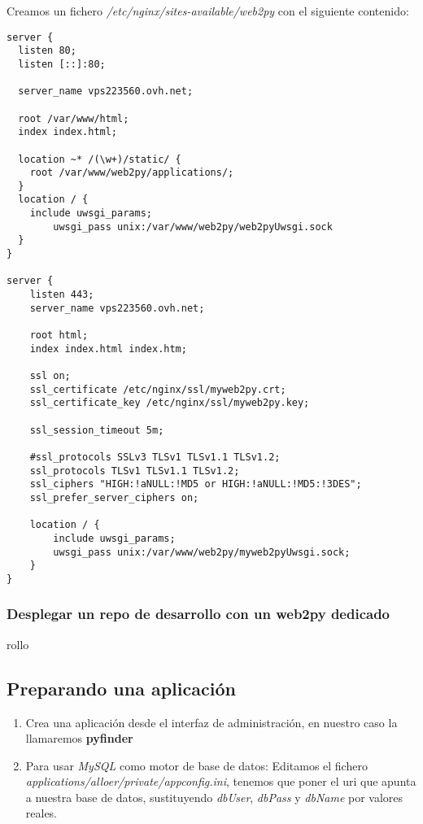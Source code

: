 \documentclass[12pt,spanish,]{article}
\begin{document}
Creamos un fichero \emph{/etc/nginx/sites-available/web2py} con el
siguiente contenido:

\begin{verbatim}
server {
  listen 80;
  listen [::]:80;

  server_name vps223560.ovh.net;

  root /var/www/html;
  index index.html;

  location ~* /(\w+)/static/ {
    root /var/www/web2py/applications/;
  }
  location / {
    include uwsgi_params;
        uwsgi_pass unix:/var/www/web2py/web2pyUwsgi.sock
  }
}

server {
    listen 443;
    server_name vps223560.ovh.net;

    root html;
    index index.html index.htm;

    ssl on;
    ssl_certificate /etc/nginx/ssl/myweb2py.crt;
    ssl_certificate_key /etc/nginx/ssl/myweb2py.key;

    ssl_session_timeout 5m;

    #ssl_protocols SSLv3 TLSv1 TLSv1.1 TLSv1.2;
    ssl_protocols TLSv1 TLSv1.1 TLSv1.2;
    ssl_ciphers "HIGH:!aNULL:!MD5 or HIGH:!aNULL:!MD5:!3DES";
    ssl_prefer_server_ciphers on;

    location / {
        include uwsgi_params;
        uwsgi_pass unix:/var/www/web2py/myweb2pyUwsgi.sock;
    }
}
\end{verbatim}

\subsubsection{Desplegar un repo de desarrollo con un web2py
dedicado}\label{desplegar-un-repo-de-desarrollo-con-un-web2py-dedicado}

rollo

\subsection{Preparando una
aplicación}\label{preparando-una-aplicaciuxf3n}

\begin{enumerate}
\def\labelenumi{\arabic{enumi}.}
\item
  Crea una aplicación desde el interfaz de administración, en nuestro
  caso la llamaremos \textbf{pyfinder}
\item
  Para usar \emph{MySQL} como motor de base de datos: Editamos el
  fichero \emph{applications/alloer/private/appconfig.ini}, tenemos que
  poner el uri que apunta a nuestra base de datos, sustituyendo
  \emph{dbUser}, \emph{dbPass} y \emph{dbName} por valores reales.
\end{enumerate}
\end{document}
